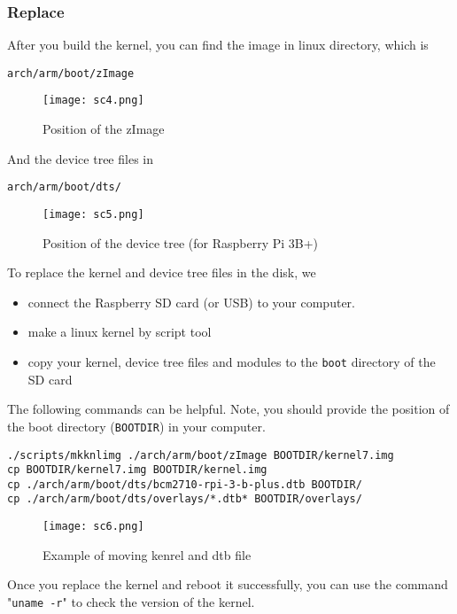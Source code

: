 \subsubsection{Replace}

After you build the kernel, you can find the image in linux directory, which is 
\begin{lstlisting}
arch/arm/boot/zImage
\end{lstlisting}
\begin{figure}[H]
	\centering
	\texttt{[image: sc4.png]}
	\caption{Position of the zImage}
\end{figure}
And the device tree files in 
\begin{lstlisting}
arch/arm/boot/dts/
\end{lstlisting}

\begin{figure}[H]
	\centering
	\texttt{[image: sc5.png]}
	\caption{Position of the device tree (for Raspberry Pi 3B+)}
\end{figure}
To replace the kernel and device tree files in the disk, we 
\begin{itemize}
	\item connect the Raspberry SD card (or USB) to your computer.
	\item make a linux kernel by script tool
	\item copy your kernel, device tree files and modules to the \texttt{boot} directory of the SD card
\end{itemize}


The following commands can be helpful. Note, you should provide the 
position of the boot directory (\texttt{BOOTDIR}) in your computer.

\begin{lstlisting}
./scripts/mkknlimg ./arch/arm/boot/zImage BOOTDIR/kernel7.img
cp BOOTDIR/kernel7.img BOOTDIR/kernel.img
cp ./arch/arm/boot/dts/bcm2710-rpi-3-b-plus.dtb BOOTDIR/
cp ./arch/arm/boot/dts/overlays/*.dtb* BOOTDIR/overlays/
\end{lstlisting}

\begin{figure}[H]
	\centering
	\texttt{[image: sc6.png]}
	\caption{Example of moving kenrel and dtb file}
\end{figure}


Once you replace the kernel and reboot it successfully, you can use the command "\texttt{uname -r}" to check the version of the kernel.

